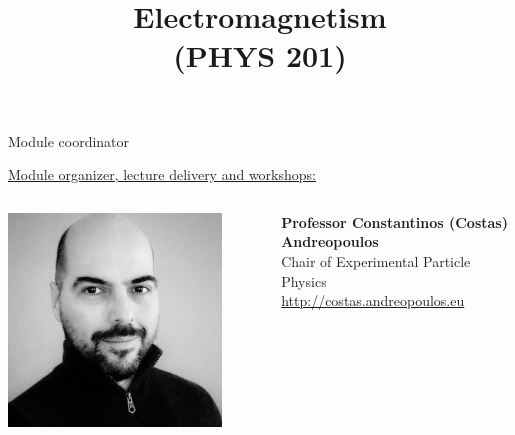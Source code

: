 \renewcommand{\prevlecture}{0}
\renewcommand{\thislecture}{0}
\renewcommand{\nextlecture}{1}

%
%

\title[PHYS 201]
{
  \Huge{Electromagnetism}\\(PHYS 201)\\
}



\begin{frame}[plain]
  \titlepage
\end{frame}


%
%

\begin{frame}{Module coordinator}

\vspace{0.3cm}

\underline{Module organizer, lecture delivery and workshops:}\\
\vspace{0.2cm}
\begin{columns}
  \begin{column}{0.20\textwidth}
   \begin{center}
     \includegraphics[width=0.85\textwidth]{./images/people/candreop.png}\\
   \end{center}
  \end{column}
  \begin{column}{0.80\textwidth}
    {\bf Professor Constantinos (Costas) Andreopoulos}\\
    Chair of Experimental Particle Physics\\
    \vspace{0.2cm}
    {\color{blue} \url{http://costas.andreopoulos.eu}}\\
  \end{column}
\end{columns}


\end{frame}
